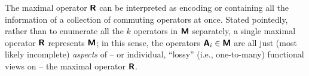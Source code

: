 The  maximal operator $\textsf{\textbf{R}}$ can be interpreted as
encoding or containing all the information of a collection of commuting operators at once.
Stated pointedly, rather than to enumerate all the $k$ operators in $\textsf{\textbf{M}}$
separately,
a single maximal operator  $\textsf{\textbf{R}}$  represents  $\textsf{\textbf{M}}$;
in this sense, the operators  $\textsf{\textbf{A}}_i \in \textsf{\textbf{M}}$
are all just (most likely incomplete) {\em aspects}  of --
or individual, ``lossy'' (i.e., one-to-many) functional views on -- the  maximal operator $\textsf{\textbf{R}}$.

%
%
%
%
%
%
%
%
%
%
%
%
%



